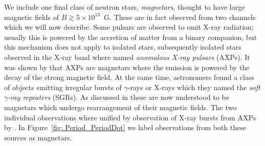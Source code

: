 We include one final class of neutron stars, \emph{magnetars}, thought to have
large magnetic fields of $B\gtrsim 5\times10^{13}$~G. These are in fact
observed from two channels which we will now describe. Some pulsars are
observed to emit X-ray radiation; usually this is powered by the accretion of
matter from a binary companion, but this mechanism does not apply to isolated
stars, subsequently isolated stars observed in the X-ray band where named
\emph{anomalous X-ray pulsars} (AXPs). It was shown by
\citet{duncan1996magnetars} that AXPs are magnetars where the emission is
powered by the decay of the strong magnetic field.  At the same time,
astronomers found a class of objects emitting irregular bursts of
$\gamma$-rays or X-rays which they named the \emph{soft $\gamma$-ray repeaters}
(SGRs). As discussed in \citet{kouveliotou2003magnetars} these are now
understood to be magnetars which undergo rearrangement of their magnetic
fields. The two individual observations where unified by observation of X-ray
bursts from AXPs by \citet{Gavriil2002}. In Figure~\ref{fig: Period_PeriodDot} we
label observations from both these sources as magnetars.
